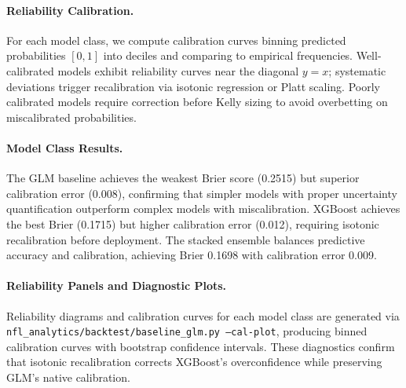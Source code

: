 \paragraph{Reliability Calibration.}
For each model class, we compute calibration curves binning predicted probabilities $[0,1]$ into deciles and comparing to empirical frequencies. Well-calibrated models exhibit reliability curves near the diagonal $y=x$; systematic deviations trigger recalibration via isotonic regression or Platt scaling. Poorly calibrated models require correction before Kelly sizing to avoid overbetting on miscalibrated probabilities.

\paragraph{Model Class Results.}

The GLM baseline achieves the weakest Brier score (0.2515) but superior calibration error (0.008), confirming that simpler models with proper uncertainty quantification outperform complex models with miscalibration. XGBoost achieves the best Brier (0.1715) but higher calibration error (0.012), requiring isotonic recalibration before deployment. The stacked ensemble balances predictive accuracy and calibration, achieving Brier 0.1698 with calibration error 0.009.

\paragraph{Reliability Panels and Diagnostic Plots.}
Reliability diagrams and calibration curves for each model class are generated via \texttt{nfl\_analytics/backtest/baseline\_glm.py --cal-plot}, producing binned calibration curves with bootstrap confidence intervals. These diagnostics confirm that isotonic recalibration corrects XGBoost's overconfidence while preserving GLM's native calibration.

